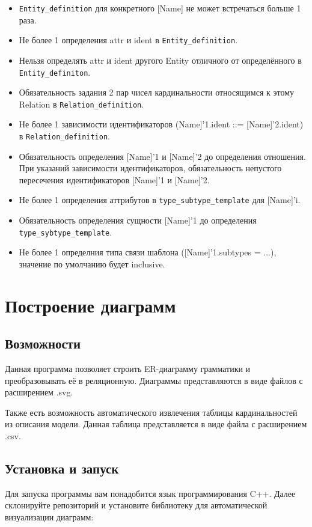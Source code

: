 \documentclass{article}
\begin{document}
\begin{itemize}
\item \verb|Entity_definition| для конкретного [Name] не может встречаться больше 1 раза.
\item Не более 1 определения attr и ident в \verb|Entity_definition|.
\item Нельзя определять attr и ident другого Entity отличного от определённого в \verb|Entity_definiton|.
\item Обязательность задания 2 пар чисел кардинальности относящимся к этому Relation в \verb|Relation_definition|.
\item Не более 1 зависимости идентификаторов (Name]'1.ident ::= [Name]'2.ident) в \verb|Relation_definition|.
\item Обязательность определения [Name]'1 и [Name]'2 до определения отношения.
\tem  При указаний зависимости идентификаторов, обязательность непустого пересечения идентификаторов [Name]'1 и [Name]'2.
\item Не более 1 определения аттрибутов в \verb|type_subtype_template| для [Name]'i.
\item Обязательность определения сущности [Name]'1 до определения \verb|type_sybtype_template|.
\item Не более 1 определния типа связи шаблона ([Name]'1.subtypes = ...), значение по умолчанию будет inclusive.
\end{itemize}




\section{Построение диаграмм}
\subsection{Возможности}
\qquad Данная программа позволяет строить ER-диаграмму грамматики и преобразовывать её в реляционную. Диаграммы представляются в виде файлов с расширением .svg.


\qquad Также есть возможность автоматического извлечения таблицы кардинальностей из описания модели. Данная таблица представляется в виде файла с расширением .csv.


\subsection{Установка и запуск}
\qquad Для запуска программы вам понадобится язык программирования C++. Далее склонируйте репозиторий и установите библиотеку для автоматической визуализации диаграмм:
\end{document}
